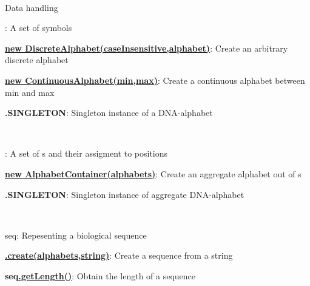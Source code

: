 \documentclass[10pt]{scrartcl}
\newcommand{\entryh}[3]{{\sfb #1#2}: #3}
\newcommand{\entry}[3]{{\bfseries #1#2}: #3}
\newcommand{\entrys}[4]{{\bfseries #1\href{\APIhome/#3}{#2}}: #4}
\newcommand{\entryc}[3]{{\bfseries \href{\APIhome/#2}{#1}}: #3}
\begin{document}
\thispagestyle{empty}


\renewcommand{\section}[1]{{
~\vspace{-0.1cm}

\large\sfb #1\vspace{0.1cm}\\}


}
\begin{flushleft}
\footnotesize
\section{Data handling}

\entryh{\Alphabet}{}{A set of symbols}

\entryc{new DiscreteAlphabet(caseInsensitive,alphabet)}{de/jstacs/data/alphabets/DiscreteAlphabet.html\#DiscreteAlphabet(boolean,\%20java.lang.String...)}{Create an arbitrary discrete alphabet}

\entryc{new ContinuousAlphabet(min,max)}{de/jstacs/data/alphabets/ContinuousAlphabet.html\#ContinuousAlphabet(double,\%20double)}{Create a continuous alphabet between min and max}

\entry{\DNAAlphabet}{.SINGLETON}{Singleton instance of a DNA-alphabet}

~

\entryh{\AlphabetContainer}{}{A set of \Alphabet s and their assigment to positions}

\entryc{new AlphabetContainer(alphabets)}{de/jstacs/data/AlphabetContainer.html\#AlphabetContainer(de.jstacs.data.alphabets.Alphabet...)}{Create an aggregate alphabet out of \Alphabet s}

\entry{\DNAAlphabetContainer}{.SINGLETON}{Singleton instance of aggregate DNA-alphabet}


~

\entryh{\Sequence}{ seq}{Repesenting a biological sequence}

\entrys{\Sequence}{.create(alphabets,string)}{de/jstacs/data/sequences/Sequence.html\#create(de.jstacs.data.AlphabetContainer,\%20java.lang.String)}{Create a sequence from a string}

\entrys{seq}{.getLength()}{de/jstacs/data/sequences/Sequence.html\#getLength()}{Obtain the length of a sequence}


\end{flushleft}
\end{document}
